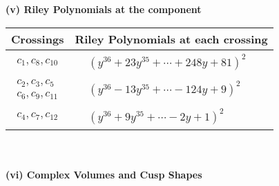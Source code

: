 \documentclass[1p]{elsarticle_modified}
\theoremstyle{definition}
\begin{document}
\newpage\renewcommand{\arraystretch}{1}
\flushleft \textbf{(v) Riley Polynomials at the component}\newline \\
\begin{tabular}{m{50pt}|m{274pt}}
Crossings & \hspace{64pt}Riley Polynomials at each crossing \\
\hline $$\begin{aligned}c_{1},c_{8},c_{10}\end{aligned}$$&$\begin{aligned}
&(y^{36}+23 y^{35}+\cdots+248 y+81)^{2}
\end{aligned}$\\
\hline $$\begin{aligned}c_{2},c_{3},c_{5}\\c_{6},c_{9},c_{11}\end{aligned}$$&$\begin{aligned}
&(y^{36}-13 y^{35}+\cdots-124 y+9)^{2}
\end{aligned}$\\
\hline $$\begin{aligned}c_{4},c_{7},c_{12}\end{aligned}$$&$\begin{aligned}
&(y^{36}+9 y^{35}+\cdots-2 y+1)^{2}
\end{aligned}$\\
\hline
\end{tabular}\\~\\
\newpage\flushleft \textbf{(vi) Complex Volumes and Cusp Shapes}
\end{document}

